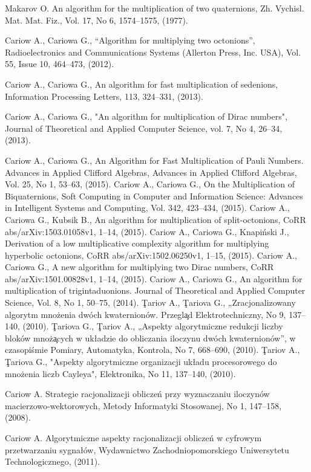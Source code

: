 \documentclass{jtacs}
\numberwithin{equation}{section}
\begin{document}
\begin{thebibliography}{26}
 Makarov O. An algorithm for the multiplication of two quaternions, Zh. Vychisl. Mat. Mat.
Fiz., Vol. 17, No 6, 1574--1575, (1977).

 Cariow A., Cariowa G., “Algorithm for multiplying two octonions”, Radioelectronics and Communications Systems (Allerton Press, Inc. USA), Vol. 55, Issue 10, 464--473, (2012).

 Cariow A., Cariowa G., An algorithm for fast multiplication of sedenions, Information Processing Letters, 113,  324--331, (2013).

 Cariow A., Cariowa G., "An algorithm for multiplication of Dirac numbers", Journal of Theoretical and Applied Computer Science, vol. 7, No 4, 26--34, (2013).

 Cariow A., Cariowa G., An Algorithm for Fast Multiplication of Pauli Numbers. Advances in Applied Clifford Algebras, Advances in Applied Clifford Algebras, Vol. 25, No 1, 53--63, (2015).
 Cariow A., Cariowa G., On the Multiplication of Biquaternions, Soft Computing in Computer and Information Science: Advances in Intelligent Systems and Computing, Vol. 342, 423--434, (2015).
 Cariow A., Cariowa G., Kubsik B., An algorithm for multiplication of split-octonions, CoRR abs/arXiv:1503.01058v1, 1--14, (2015).
 Cariow A., Cariowa G., Knapi\'{n}ski J., Derivation of a low multiplicative complexity algorithm for multiplying hyperbolic octonions, CoRR abs/arXiv:1502.06250v1, 1--15, (2015).
 Cariow A., Cariowa G., A new algorithm for multiplying two Dirac numbers, CoRR abs/arXiv:1501.00828v1, 1--14, (2015).
 Cariow A., Cariowa G., An algorithm for multiplication of trigintaduonions. Journal of Theoretical and Applied Computer Science, Vol. 8, No 1, 50--75, (2014).
 \c{T}ariov A., \c{T}ariova G., „Zracjonalizowany algorytm mno\.{z}enia dw\'{o}ch kwaternion\'{o}w. Przegl\c{a}d Elektrotechniczny, No 9, 137--140, (2010).
 \c{T}ariova G., \c{T}ariov A., „Aspekty algorytmiczne redukcji liczby blok\'{o}w mno\.{z}\c{a}cych w uk\l{}adzie do obliczania iloczynu dw\'{o}ch kwaternion\'{o}w”, w czasopi\'{s}mie Pomiary, Automatyka, Kontrola, No 7, 668--690, (2010).
 \c{T}ariov A., \c{T}ariova G., "Aspekty algorytmiczne organizacji uk\l{}adu procesorowego do mno\.{z}enia liczb Cayleya", Elektronika, No 11, 137--140, (2010).

 Cariow A. Strategie racjonalizacji oblicze\'{n} przy wyznaczaniu iloczyn\'{o}w macierzowo-wektorowych,
Metody Informatyki Stosowanej, No 1, 147--158, (2008).

 Cariow A. Algorytmiczne aspekty racjonalizacji oblicze\'{n} w cyfrowym przetwarzaniu
sygna\l{}\'{o}w, Wydawnictwo Zachodniopomorskiego Uniwersytetu Technologicznego, (2011).

\end{thebibliography}
\end{document}
